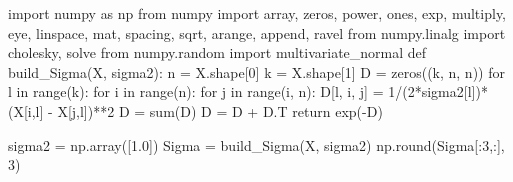 \documentclass[
  letterpaper,
  DIV=11,
  numbers=noendperiod]{scrreprt}
\newenvironment{Shaded}{\begin{snugshade}}{\end{snugshade}}
\newcommand{\BuiltInTok}[1]{\textcolor[rgb]{0.00,0.23,0.31}{#1}}
\newcommand{\ControlFlowTok}[1]{\textcolor[rgb]{0.00,0.23,0.31}{#1}}
\newcommand{\DecValTok}[1]{\textcolor[rgb]{0.68,0.00,0.00}{#1}}
\newcommand{\FloatTok}[1]{\textcolor[rgb]{0.68,0.00,0.00}{#1}}
\newcommand{\ImportTok}[1]{\textcolor[rgb]{0.00,0.46,0.62}{#1}}
\newcommand{\KeywordTok}[1]{\textcolor[rgb]{0.00,0.23,0.31}{#1}}
\newcommand{\NormalTok}[1]{\textcolor[rgb]{0.00,0.23,0.31}{#1}}
\newcommand{\OperatorTok}[1]{\textcolor[rgb]{0.37,0.37,0.37}{#1}}
\begin{document}
\begin{Shaded}
\begin{Highlighting}[]
\ImportTok{import}\NormalTok{ numpy }\ImportTok{as}\NormalTok{ np}
\ImportTok{from}\NormalTok{ numpy }\ImportTok{import}\NormalTok{ array, zeros, power, ones, exp, multiply, eye, linspace, mat, spacing, sqrt, arange, append, ravel}
\ImportTok{from}\NormalTok{ numpy.linalg }\ImportTok{import}\NormalTok{ cholesky, solve}
\ImportTok{from}\NormalTok{ numpy.random }\ImportTok{import}\NormalTok{ multivariate\_normal}
\KeywordTok{def}\NormalTok{ build\_Sigma(X, sigma2):}
\NormalTok{    n }\OperatorTok{=}\NormalTok{ X.shape[}\DecValTok{0}\NormalTok{]}
\NormalTok{    k }\OperatorTok{=}\NormalTok{ X.shape[}\DecValTok{1}\NormalTok{]}
\NormalTok{    D }\OperatorTok{=}\NormalTok{ zeros((k, n, n))}
    \ControlFlowTok{for}\NormalTok{ l }\KeywordTok{in} \BuiltInTok{range}\NormalTok{(k):}
        \ControlFlowTok{for}\NormalTok{ i }\KeywordTok{in} \BuiltInTok{range}\NormalTok{(n):}
            \ControlFlowTok{for}\NormalTok{ j }\KeywordTok{in} \BuiltInTok{range}\NormalTok{(i, n):}
\NormalTok{                D[l, i, j] }\OperatorTok{=} \DecValTok{1}\OperatorTok{/}\NormalTok{(}\DecValTok{2}\OperatorTok{*}\NormalTok{sigma2[l])}\OperatorTok{*}\NormalTok{(X[i,l] }\OperatorTok{{-}}\NormalTok{ X[j,l])}\OperatorTok{**}\DecValTok{2}
\NormalTok{    D }\OperatorTok{=} \BuiltInTok{sum}\NormalTok{(D)}
\NormalTok{    D }\OperatorTok{=}\NormalTok{ D }\OperatorTok{+}\NormalTok{ D.T}
    \ControlFlowTok{return}\NormalTok{ exp(}\OperatorTok{{-}}\NormalTok{D)  }
\end{Highlighting}
\end{Shaded}

\begin{Shaded}
\begin{Highlighting}[]
\NormalTok{sigma2 }\OperatorTok{=}\NormalTok{ np.array([}\FloatTok{1.0}\NormalTok{])}
\NormalTok{Sigma }\OperatorTok{=}\NormalTok{ build\_Sigma(X, sigma2)}
\NormalTok{np.}\BuiltInTok{round}\NormalTok{(Sigma[:}\DecValTok{3}\NormalTok{,:], }\DecValTok{3}\NormalTok{)}
\end{Highlighting}
\end{Shaded}
\end{document}
